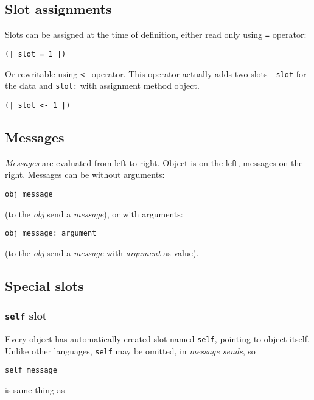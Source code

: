\documentclass[10pt]{article}
\begin{document}
\begin{multicols*}{3}
\subsection{Slot assignments}

Slots can be assigned at the time of definition, either read only using \texttt{=} operator:

\texttt{(| slot = 1 |)}

Or rewritable using \texttt{<-} operator. This operator actually adds two slots - \texttt{slot} for the data and \texttt{slot:} with assignment method object.

\texttt{(| slot <- 1 |)}



\subsection{Messages}

\textit{Messages} are evaluated from left to right. Object is on the left, messages on the right. Messages can be without arguments:

\begin{lstlisting}
obj message
\end{lstlisting}

(to the \textit{obj} send a \textit{message}), or with arguments:

\begin{lstlisting}
obj message: argument
\end{lstlisting}

(to the \textit{obj} send a \textit{message} with \textit{argument} as value).




\columnbreak
{\small
\subsection{Special slots}

\subsubsection{\texttt{self} slot}
Every object has automatically created slot named \texttt{self}, pointing to object itself. Unlike other languages, \texttt{self} may be omitted, in \textit{message sends}, so

\begin{lstlisting}
self message
\end{lstlisting}

is same thing as

}
\end{multicols*}
\end{document}
